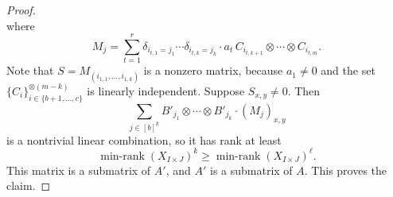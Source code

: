\documentclass{daj}
\DeclareMathOperator{\minrnk}{min-rank}
\begin{document}
\begin{proof}
\[    \]
    where
    \[
    M_j = \sum_{t=1}^r\delta_{i_{t,1}=j_1}\cdots\delta_{i_{t,k}=j_k}\cdot a_t\, C_{i_{t,k+1}}\otimes\cdots\otimes C_{i_{t,m}}.
    \]
    Note that $S = M_{(i_{1,1},\dots,i_{1,k})}$ is a nonzero matrix, because 
    $a_1\neq0$ and the set $\{C_i\}_{i\in\{b+1,\dots,c\}}^{\otimes(m-k)}$ is linearly independent. %
%
%
    Suppose $S_{x,y}\neq 0$.
    Then
    \[
    \sum_{{j}\in[b]^k}B'_{j_1}\otimes\cdots\otimes B'_{j_k} \cdot (M_j)_{x,y}
    \]
    is a nontrivial linear combination, so it has rank at least 
    \[
    \minrnk(X_{I\times J})^k\geq \minrnk(X_{I\times J})^\ell.
    \]
    This matrix is a submatrix of $A'$, and $A'$ is a submatrix of $A$. This proves the claim.
\end{proof}
\end{document}
